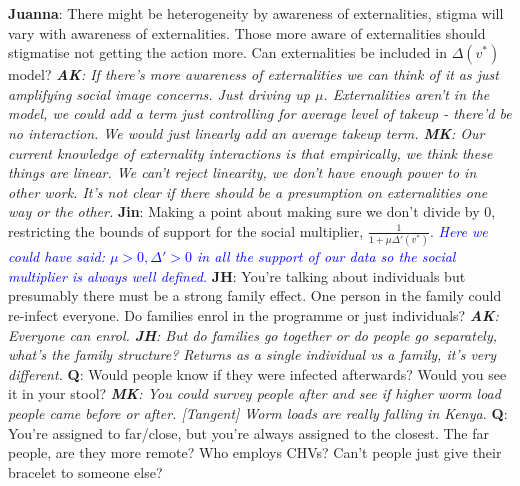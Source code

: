 \documentclass{article}
\begin{document}
\newline
\newline
\textbf{Juanna}: There might be heterogeneity by awareness of externalities, stigma 
will vary with awareness of externalities. Those more aware of externalities should 
stigmatise not getting the action more. Can externalities be included in $\Delta(v^*)$ model?
\emph{
    \textbf{AK}: If there's more awareness of externalities we can think of it as 
    just amplifying social image concerns. Just driving up $\mu$. 
    Externalities aren't in the model, we could add a term just controlling for 
    average level of takeup - there'd be no interaction. We would just linearly add 
    an average takeup term.
    \textbf{MK}: Our current knowledge of externality interactions is that empirically, 
    we think these things are linear. We can't reject linearity, we don't have enough 
    power to in other work. It's not clear if there should be a presumption on 
    externalities one way or the other.
}
\newline
\newline
\textbf{Jin}: Making a point about making sure we don't divide by $0$, restricting the 
bounds of support for the social multiplier, $\frac{1}{1 + \mu \Delta'(v^*)}$.
\emph{
    \textcolor{blue}{
    Here we could have said: $\mu > 0, \Delta' > 0$ in all the support of our data so the social 
    multiplier is always well defined.}
}
\newline
\newline
\textbf{JH}: You're talking about individuals but presumably there must be a strong 
family effect. One person in the family could re-infect everyone. Do families enrol 
in the programme or just individuals?
\emph{
    \textbf{AK}: Everyone can enrol. \textbf{JH}: But do families go together or 
    do people go separately, what's the family structure? Returns as a single 
    individual vs a family, it's very different.
}
\newline
\newline
\textbf{Q}: Would people know if they were infected afterwards? Would you see it 
in your stool?
\emph{\textbf{MK}: You could survey people after and see if higher worm load people 
came before or after. [Tangent] Worm loads are really falling in Kenya.}
\newline
\newline
\textbf{Q}: You're assigned to far/close, but you're always assigned to the closest. The 
far people, are they more remote? Who employs CHVs? Can't people just give their 
bracelet to someone else?
\end{document}
